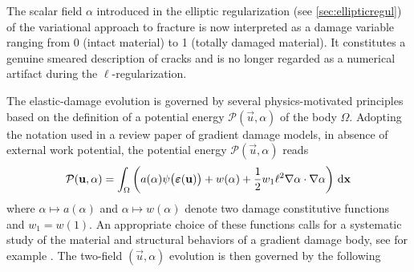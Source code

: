 The scalar field $\alpha$ introduced in the elliptic regularization (see \cref{sec:ellipticregul}) of the variational approach to fracture is now interpreted as a damage variable ranging from 0 (intact material) to 1 (totally damaged material). It constitutes a genuine smeared description of cracks and is no longer regarded as a numerical artifact during the $\ell$-regularization.

The elastic-damage evolution is governed by several physics-motivated principles based on the definition of a potential energy $\mathcal{P}(\vec{u},\alpha)$ of the body $\Omega$. Adopting the notation used in a review paper \cite{PhamAmorMarigoMaurini:2011} of gradient damage models, in absence of external work potential, the potential energy $\mathcal{P}(\vec{u},\alpha)$ reads
\begin{equation} \label{eq:Pgd}
\mathcal{P}(\vec{u},\alpha)=\int_\Omega\left( a(\alpha)\psi\bigl(\eps(\vec{u})\bigr)+w(\alpha)+\frac{1}{2}w_1\ell^2\nabla\alpha\cdot\nabla\alpha\right)\dx
\end{equation}
where $\alpha\mapsto a(\alpha)$ and $\alpha\mapsto w(\alpha)$ denote two damage constitutive functions and $w_1=w(1)$. An appropriate choice of these functions calls for a systematic study of the material and structural behaviors of a gradient damage body, see for example \cite{PhamMarigo:2013,PhamAmorMarigoMaurini:2011,PhamMarigoMaurini:2011}. The two-field $(\vec{u},\alpha)$ evolution is then governed by the following
